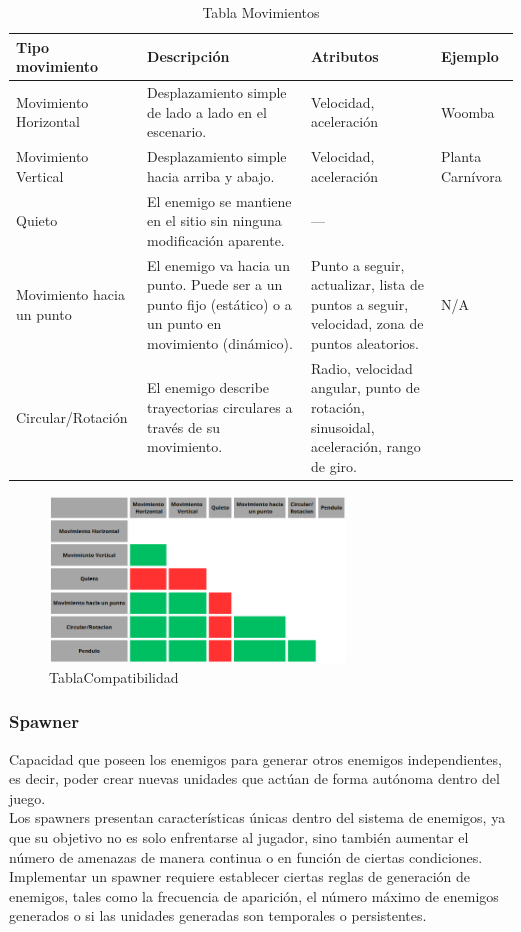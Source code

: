 \begin{table}
	\centering
	\begin{tabular}{|p{3cm}|p{4.5cm}|p{4cm}|p{3cm}|}
	\hline
	\textbf{Tipo movimiento} & \textbf{Descripción} & \textbf{Atributos} & \textbf{Ejemplo} \\ 
	\hline
	Movimiento Horizontal & Desplazamiento simple de lado a lado en el escenario. & Velocidad, aceleración & Woomba \\ 
	\hline
	Movimiento Vertical & Desplazamiento simple hacia arriba y abajo. & Velocidad, aceleración & Planta Carnívora \\ 
	\hline
	Quieto & El enemigo se mantiene en el sitio sin ninguna modificación aparente. & —  \\ 
	\hline
	Movimiento hacia un punto & El enemigo va hacia un punto. Puede ser a un punto fijo (estático) o a un punto en movimiento (dinámico). & Punto a seguir, actualizar, lista de puntos a seguir, velocidad, zona de puntos aleatorios. & N/A \\ 
	\hline
	Circular/Rotación & El enemigo describe trayectorias circulares a través de su movimiento. & Radio, velocidad angular, punto de rotación, sinusoidal, aceleración, rango de giro.  \\ 
	\hline
	\end{tabular}
	\caption{Tabla Movimientos}
	\label{tab:movimientos}
\end{table}

\begin{figure}[h]
	\centering
	\includegraphics[width = 0.7\textwidth]{Imagenes/TablaCompatibilidad.png}
	\caption{TablaCompatibilidad }
	\label{fig:TablaCompatibilidad}
\end{figure}
\subsubsection{Spawner}
Capacidad que poseen los enemigos para generar otros enemigos independientes, es decir, poder crear nuevas unidades que actúan de forma autónoma dentro del juego.\\
Los spawners presentan características únicas dentro del sistema de enemigos, ya que su objetivo no es solo enfrentarse al jugador, sino también aumentar el número de amenazas de manera continua o en función de ciertas condiciones.
Implementar un spawner requiere establecer ciertas reglas de generación de enemigos, tales como la frecuencia de aparición, el número máximo de enemigos generados o si las unidades generadas son temporales o persistentes.
